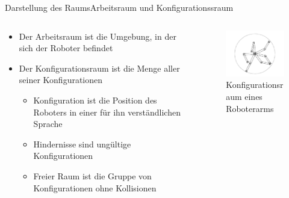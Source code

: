 \documentclass[t,aspectratio=169,dvipsnames]{beamer}
\begin{document}
\begin{frame}{Darstellung des Raums}{Arbeitsraum und Konfigurationssraum}
	
	\begin{columns}
		\begin{column}[T]{0.6\textwidth}
			\begin{itemize}
				\item Der Arbeitsraum ist die Umgebung, in der sich der Roboter befindet\newline
				\item Der Konfigurationsraum ist die Menge aller seiner Konfigurationen
				\begin{itemize}[<+->]
					\item Konfiguration ist die Position des Roboters in einer für ihn verständlichen Sprache
					\item Hindernisse sind ungültige Konfigurationen
					\item Freier Raum ist die Gruppe von Konfigurationen ohne Kollisionen
					\end{itemize}
			\end{itemize}
		\end{column}
		\begin{column}[T]{0.4\textwidth}
			\begin{figure}
				\includegraphics[width=4.5cm]{images/Bild2.png}
				\caption{Konfigurationsraum eines Roboterarms} 
			\end{figure}
		\end{column}
	\end{columns}
\end{frame}
\end{document}
